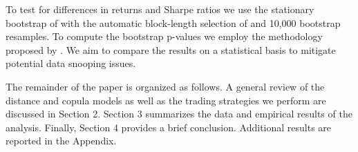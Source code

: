 	To test for differences in returns and Sharpe ratios we use the stationary bootstrap of \citet*{pr94} with the automatic block-length selection of \citet*{pw04} and 10,000 bootstrap resamples. To compute the bootstrap p-values we employ the methodology proposed by \citet*{lw08}. We aim to compare the results on a statistical basis to mitigate potential data snooping issues.
	
	The remainder of the paper is organized as follows. A general review of the distance and copula models as well as the trading strategies we perform are discussed in Section 2. Section 3 summarizes the data and empirical results of the analysis. Finally, Section 4 provides a brief conclusion. Additional results are reported in the Appendix.
	
	\vspace{0.6cm}
